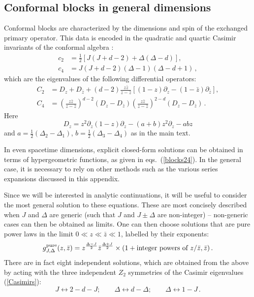 \documentclass[11pt, reqno,preprint]{article}
\def\be{\begin{equation}}
\def\ee{\end{equation}}
\def\gpure{g^{\rm pure}}
\def\zbar{\bar{z}}
\def\j{J}
\begin{document}
\begin{appendix}
\section{Conformal blocks in general dimensions}\label{app:blocks}

Conformal blocks are characterized by the dimensions and spin of the exchanged primary operator.
This data is encoded in the quadratic and quartic Casimir invariants
of the conformal algebra \cite{Dolan:2011dv,Hogervorst:2013kva}:
\be\begin{aligned}
 c_2&= \tfrac12\left[\j(\j+d-2)+\Delta(\Delta-d)\right],\\
 c_4&= \j(\j+d-2)(\Delta-1)(\Delta-d+1)\,, \label{Casimirs}
\end{aligned}\ee
which are the eigenvalues of the following differential operators:
\be\begin{aligned}
 C_2&= D_z+D_{\zbar}+(d-2)\frac{z\zbar}{z-\zbar}\left[(1-z)\partial_z-(1-\zbar)\partial_{\zbar}\right],\\
 C_4&= \left(\frac{z\zbar}{z-\zbar}\right)^{d-2} (D_z-D_{\zbar})\left(\frac{z\zbar}{z-\zbar}\right)^{2-d}(D_z-D_{\zbar})\,.
\label{Casimir_ops}\end{aligned}\ee
Here
\be
D_z=z^2\partial_z(1-z)\partial_z-(a+b)z^2\partial_z-abz
\ee
and $a=\tfrac12(\Delta_2-\Delta_1)$, $b=\tfrac12(\Delta_{3}-\Delta_4)$ as in the main text.

In even spacetime dimensions, explicit closed-form solutions can be obtained in terms of hypergeometric functions,
as given in eqs.~(\ref{blocks24}).  In the general case, it is necessary to rely on other methods such
as the various series expansions discussed in this appendix.  

Since we will be interested in analytic continuations, it will be useful to consider the most general solution
to these equations. These are most concisely described when $\j$ and $\Delta$
are generic (such that $\j$ and $\j\pm \Delta$ are non-integer) -- non-generic cases can then be obtained as limits.
One can then choose solutions that are pure power laws in the limit $0\ll z\ll \zbar\ll 1$, labelled by their exponents:
\be
 \gpure_{\j,\Delta}(z,\zbar) = z^{\frac{\Delta-\j}{2}}\zbar^{\frac{\Delta+\j}{2}}\times (1 + \mbox{integer powers of $z/\zbar,\zbar$})\,. \label{gpure}
\ee
There are in fact eight independent solutions, which are obtained from the above
by acting with the three independent $Z_2$ symmetries of the Casimir eigenvalues (\ref{Casimirs}):
\be
 \j{\longleftrightarrow}2-d-\j; \qquad \Delta\longleftrightarrow d-\Delta;\qquad \Delta \longleftrightarrow 1-\j\,. \label{symmetries}
\ee


\end{appendix}
\end{document}
